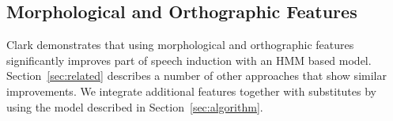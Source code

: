 \subsection{Morphological and Orthographic Features}
\label{sec:feat}

Clark  demonstrates that
using morphological and orthographic features significantly improves
part of speech induction with an HMM based model.
Section~\ref{sec:related} describes a number of other approaches that
show similar improvements.  We integrate additional features together
with substitutes by using the model described in
Section~\ref{sec:algorithm}.





